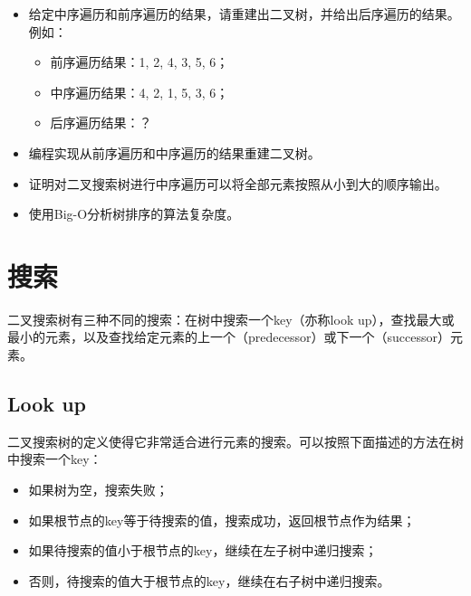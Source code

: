 \documentclass[UTF8]{article}
\begin{document}
\begin{Exercise}

\begin{itemize}
\item 给定中序遍历和前序遍历的结果，请重建出二叉树，并给出后序遍历的结果。例如：
\begin{itemize}
\item 前序遍历结果：1, 2, 4, 3, 5, 6；
\item 中序遍历结果：4, 2, 1, 5, 3, 6；
\item 后序遍历结果：？
\end{itemize}

\item 编程实现从前序遍历和中序遍历的结果重建二叉树。

\item 证明对二叉搜索树进行中序遍历可以将全部元素按照从小到大的顺序输出。

\item 使用Big-O分析树排序的算法复杂度。
\end{itemize}
\end{Exercise}

\section{搜索}

二叉搜索树有三种不同的搜索：在树中搜索一个key（亦称look up），查找最大或最小的元素，以及查找给定元素的上一个（predecessor）或下一个（successor）元素。

\subsection{Look up}
二叉搜索树的定义使得它非常适合进行元素的搜索。可以按照下面描述的方法在树中搜索一个key：

\begin{itemize}
\item 如果树为空，搜索失败；
\item 如果根节点的key等于待搜索的值，搜索成功，返回根节点作为结果；
\item 如果待搜索的值小于根节点的key，继续在左子树中递归搜索；
\item 否则，待搜索的值大于根节点的key，继续在右子树中递归搜索。
\end{itemize}
\end{document}
